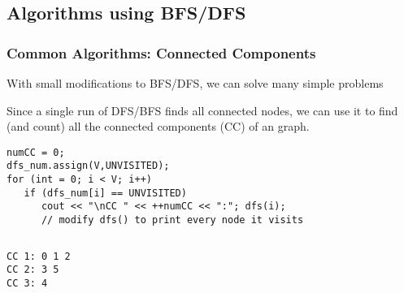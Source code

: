 \documentclass{beamer}
\begin{document}
\subsection{Algorithms using BFS/DFS}
\begin{frame}
  \frametitle{Common Algorithms: Connected Components}
  {\smaller
    \begin{block}{}
      With small modifications to BFS/DFS, we can solve many simple problems
    \end{block}

    Since a single run of DFS/BFS finds all connected nodes, we can
    use it to find (and count) all the connected components (CC) of an
     graph.

    \begin{exampleblock}{}
\begin{verbatim}
numCC = 0;
dfs_num.assign(V,UNVISITED);
for (int = 0; i < V; i++)
   if (dfs_num[i] == UNVISITED)
      cout << "\nCC " << ++numCC << ":"; dfs(i);
      // modify dfs() to print every node it visits
\end{verbatim}
    \end{exampleblock}}

\begin{columns}
  \hfill
\begin{verbatim}
CC 1: 0 1 2
CC 2: 3 5
CC 3: 4
\end{verbatim}
\end{columns}
\end{frame}
\end{document}
